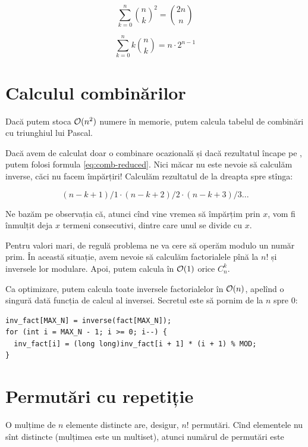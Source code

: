 \documentclass[../main.tex]{subfiles}
\begin{document}
\begin{equation}
  \sum_{k=0}^{n} \binom{n}{k}^2 = \binom{2n}{n}
\end{equation}

\begin{equation}
  \sum_{k=0}^{n} k \binom{n}{k} = n \cdot 2^{n-1}
\end{equation}

\section{Calculul combinărilor}

Dacă putem stoca $\mathcal{O}(n^2)$ numere în memorie, putem calcula tabelul de combinări cu triunghiul lui Pascal.

Dacă avem de calculat doar o combinare ocazională și dacă rezultatul încape pe , putem folosi formula \ref{eq:comb-reduced}. Nici măcar nu este nevoie să calculăm inverse, căci nu facem împărțiri! Calculăm rezultatul de la dreapta spre stînga:

$$(n - k + 1) / 1 \cdot (n - k + 2) / 2 \cdot (n - k + 3) / 3 ...$$

Ne bazăm pe observația că, atunci cînd vine vremea să împărțim prin $x$, vom fi înmulțit deja $x$ termeni consecutivi, dintre care unul se divide cu $x$.

Pentru valori mari, de regulă problema ne va cere să operăm modulo un număr prim. În această situație, avem nevoie să calculăm factorialele pînă la $n!$ și inversele lor modulare. Apoi, putem calcula în $\mathcal{O}(1)$ orice $C_n^k$.

Ca optimizare, putem calcula toate inversele factorialelor în $\mathcal{O}(n)$, apelînd o singură dată funcția de calcul al inversei. Secretul este să pornim de la $n$ spre 0:

\begin{verbatim}
inv_fact[MAX_N] = inverse(fact[MAX_N]);
for (int i = MAX_N - 1; i >= 0; i--) {
  inv_fact[i] = (long long)inv_fact[i + 1] * (i + 1) % MOD;
}
\end{verbatim}

\section{Permutări cu repetiție}

O mulțime de $n$ elemente distincte are, desigur, $n!$ permutări. Cînd elementele nu sînt distincte (mulțimea este un multiset), atunci numărul de permutări este
\end{document}
